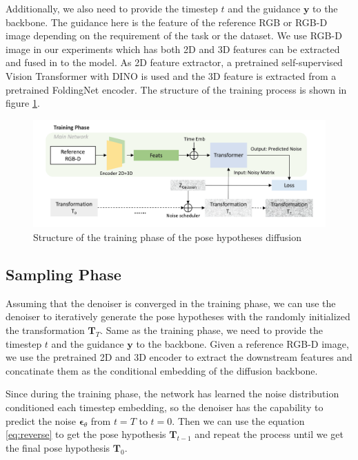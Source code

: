 \documentclass[12pt,DIV14,BCOR12mm,a4paper,footinclude=false,headinclude,parskip=half-,twoside,openright,cleardoublepage=empty,toc=index,bibliography=totoc,listof=totoc]{scrreprt}
\numberwithin{equation}{chapter}
\begin{document}
Additionally, we also need to provide the timestep $t$ and the guidance $\mathbf{y}$ to the backbone. The guidance here is the feature of the reference RGB or RGB-D image depending on the requirement of the task or the dataset. We use RGB-D image in our experiments which has both 2D and 3D features can be extracted and fused in to the model. As 2D feature extractor, a pretrained self-supervised Vision Transformer
 with DINO\cite{caron2021emerging} is used and the 3D feature is extracted from a pretrained FoldingNet encoder\cite{yang2018foldingnet}. The structure of the training process is shown in figure \ref{img:train}.

\begin{figure}[h]
	\centering
	\includegraphics[scale=.23]{img/train.png}
	\caption{Structure of the training phase of the pose hypotheses diffusion}
	\label{img:train}
\end{figure}

\subsection{Sampling Phase}
Assuming that the denoiser is converged in the training phase, we can use the denoiser to iteratively generate the pose hypotheses with the randomly initialized the transformation $\mathbf{T}_{T}$. Same as the training phase, we need to provide the timestep $t$ and the guidance $\mathbf{y}$ to the backbone. Given a reference RGB-D image, we use the pretrained 2D and 3D encoder to extract the downstream features and concatinate them as the conditional embedding of the diffusion backbone. 

Since during the training phase, the network has learned the noise distribution conditioned each timestep embedding, so the denoiser has the capability to predict the noise $\boldsymbol{\epsilon}_{\theta}$ from $t=T$ to $t=0$. Then we can use the equation \ref{eq:reverse} to get the pose hypothesis $\mathbf{T}_{t-1}$ and repeat the process until we get the final pose hypothesis $\mathbf{T}_{0}$. 
\end{document}
